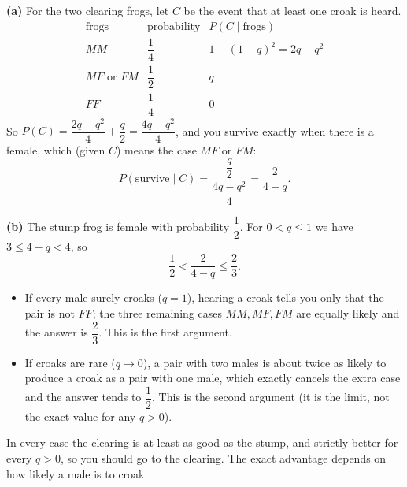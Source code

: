 \textbf{(a)} For the two clearing frogs, let $C$ be the event that at least one croak is heard.
\[
\begin{array}{c|c|c}
\text{frogs} & \text{probability} & P(C\mid\text{frogs})\\ \hline
MM & \dfrac{1}{4} & 1-(1-q)^2=2q-q^2\\
MF\text{ or }FM & \dfrac{1}{2} & q\\
FF & \dfrac{1}{4} & 0
\end{array}
\]
So $P(C)=\dfrac{2q-q^2}{4}+\dfrac{q}{2}=\dfrac{4q-q^2}{4}$, and you survive exactly when there is a female, which (given $C$) means the case $MF$ or $FM$:
\[
P(\text{survive}\mid C)=\dfrac{\dfrac{q}{2}}{\dfrac{4q-q^2}{4}}=\boxed{\dfrac{2}{4-q}} .
\]

\textbf{(b)} The stump frog is female with probability $\dfrac{1}{2}$. For $0<q\le1$ we have $3\le4-q<4$, so
\[
\dfrac{1}{2}<\dfrac{2}{4-q}\le\dfrac{2}{3}.
\]
\begin{itemize}
\item If every male surely croaks ($q=1$), hearing a croak tells you only that the pair is not $FF$; the three remaining cases $MM, MF, FM$ are equally likely and the answer is $\dfrac{2}{3}$. This is the first argument.
\item If croaks are rare ($q\to0$), a pair with two males is about twice as likely to produce a croak as a pair with one male, which exactly cancels the extra case and the answer tends to $\dfrac{1}{2}$. This is the second argument (it is the limit, not the exact value for any $q>0$).
\end{itemize}
In every case the clearing is at least as good as the stump, and strictly better for every $q>0$, so you should go to the clearing. The exact advantage depends on how likely a male is to croak.
